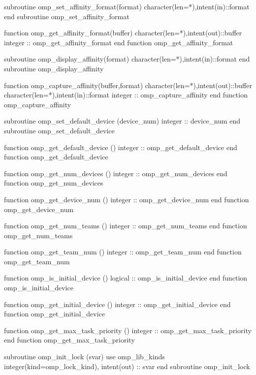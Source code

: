 {\begin{ompfFunction}
          subroutine omp_set_affinity_format(format)
           character(len=*),intent(in)::format
          end subroutine omp_set_affinity_format

          function omp_get_affinity_format(buffer)
           character(len=*),intent(out)::buffer
           integer :: omp_get_affinity_format
          end function omp_get_affinity_format

          subroutine omp_display_affinity(format)
           character(len=*),intent(in)::format
          end subroutine omp_display_affinity

          function omp_capture_affinity(buffer,format)
           character(len=*),intent(out)::buffer
           character(len=*),intent(in)::format
           integer :: omp_capture_affinity
          end function omp_capture_affinity

          subroutine omp_set_default_device (device_num)
           integer :: device_num
          end subroutine omp_set_default_device

          function omp_get_default_device ()
           integer :: omp_get_default_device
          end function omp_get_default_device

          function omp_get_num_devices ()
           integer :: omp_get_num_devices
          end function omp_get_num_devices

          function omp_get_device_num ()
           integer :: omp_get_device_num
          end function omp_get_device_num

          function omp_get_num_teams ()
           integer :: omp_get_num_teams
          end function omp_get_num_teams

          function omp_get_team_num ()
           integer :: omp_get_team_num
          end function omp_get_team_num

          function omp_is_initial_device ()
           logical :: omp_is_initial_device
          end function omp_is_initial_device

          function omp_get_initial_device ()
           integer :: omp_get_initial_device
          end function omp_get_initial_device

          function omp_get_max_task_priority ()
           integer :: omp_get_max_task_priority
          end function omp_get_max_task_priority

          subroutine omp_init_lock (svar)
           use omp_lib_kinds
           integer(kind=omp_lock_kind), intent(out) :: svar
          end subroutine omp_init_lock


\end{ompfFunction}}
